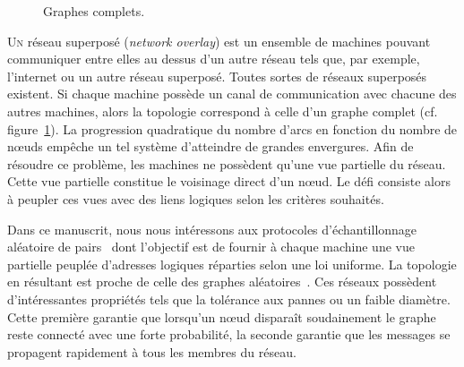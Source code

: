 




\begin{figure}
  \begin{center}
    
    \caption[Graphes complets]{\label{net:fig:completegraph}Graphes complets.}
  \end{center}
\end{figure}

\lettrine{U}n réseau superposé (\emph{network overlay}) est un ensemble de
machines pouvant communiquer entre elles au dessus d'un autre réseau tels que,
par exemple, l'internet ou un autre réseau superposé.  Toutes sortes de réseaux
superposés existent. Si chaque machine possède un canal de communication avec
chacune des autres machines, alors la topologie correspond à celle d'un graphe
complet (cf. figure~\ref{net:fig:completegraph}). La progression quadratique du
nombre d'arcs en fonction du nombre de nœuds empêche un tel système d'atteindre
de grandes envergures. Afin de résoudre ce problème, les machines ne possèdent
qu'une vue partielle du réseau. Cette vue partielle constitue le voisinage
direct d'un nœud. Le défi consiste alors à peupler ces vues avec des liens
logiques selon les critères souhaités.

Dans ce manuscrit, nous nous intéressons aux protocoles d'échantillonnage
aléatoire de pairs~\cite{jelasity2007gossip} dont l'objectif est de fournir à
chaque machine une vue partielle peuplée d'adresses logiques réparties selon une
loi uniforme. La topologie en résultant est proche de celle des graphes
aléatoires~\cite{erdos1959random}. Ces réseaux possèdent d'intéressantes
propriétés tels que la tolérance aux pannes ou un faible diamètre. Cette
première garantie que lorsqu'un nœud disparaît soudainement le graphe reste
connecté avec une forte probabilité, la seconde garantie que les messages se
propagent rapidement à tous les membres du réseau.

